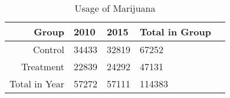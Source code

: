 \begin{table}[ht]
\centering
\begin{tabular}{rllll}
  \hline
 Group & 2010 & 2015 & Total in Group \\ 
  \hline
Control & 34433 & 32819 & 67252 \\ 
Treatment & 22839 & 24292 & 47131 \\ 
 Total in Year & 57272 & 57111 & 114383 \\ 
   \hline
\end{tabular}
\caption{Usage of Marijuana}
\end{table}
